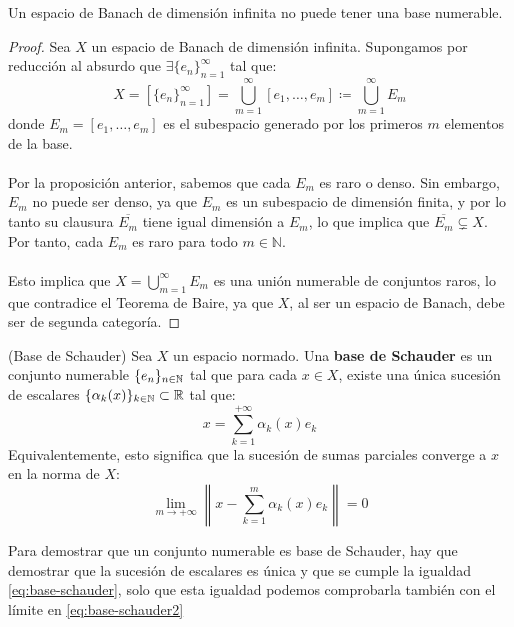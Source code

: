 \begin{coro}
    Un espacio de Banach de dimensión infinita no puede tener una base numerable.
\begin{proof}
    Sea $X$ un espacio de Banach de dimensión infinita. Supongamos por reducción al absurdo que $\exists \{e_n\}_{n=1}^{\infty}$ tal que:
    \begin{equation*}
        X = [\{e_n\}_{n=1}^{\infty}] = \bigcup_{m=1}^{\infty} [e_1, \dots, e_m] \coloneqq \bigcup_{m=1}^{\infty} E_m 
    \end{equation*}
    donde $E_m = [e_1, \dots, e_m]$ es el subespacio generado por los primeros $m$ elementos de la base.\\ \\
    \noindent
    Por la proposición anterior, sabemos que cada $E_m$ es raro o denso. Sin embargo, $E_m$ no puede ser denso, ya que $E_m$ es un subespacio de dimensión finita, y por lo tanto su clausura $\overline{E_m}$ tiene igual dimensión a $E_m$, lo que implica que $\overline{E_m} \subsetneq X$. Por tanto, cada $E_m$ es raro para todo $m \in \mathbb{N}$.\\ \\
    \noindent
    Esto implica que $X = \bigcup_{m=1}^{\infty} E_m$ es una unión numerable de conjuntos raros, lo que contradice el Teorema de Baire, ya que $X$, al ser un espacio de Banach, debe ser de segunda categoría.
\end{proof}
\end{coro}

\begin{definicion}(Base de Schauder)
    Sea $X$ un espacio normado. Una \textbf{base de Schauder} es un conjunto numerable $\{e_n\}_{n\in \mathbb{N}}$ tal que para cada $x \in X$, existe una única sucesión de escalares $\{\alpha_k(x)\}_{k\in \mathbb{N}} \subset \mathbb{R}$ tal que:
    \begin{equation}\label{eq:base-schauder}
        x = \sum_{k=1}^{+\infty} \alpha_k(x)e_k 
    \end{equation}
    Equivalentemente, esto significa que la sucesión de sumas parciales converge a $x$ en la norma de $X$:
    \begin{equation}\label{eq:base-schauder2}
        \lim_{m \to +\infty} \left\|x - \sum_{k=1}^{m} \alpha_k(x)e_k\right\| = 0 
    \end{equation}
\end{definicion}

\begin{observacion}
    Para demostrar que un conjunto numerable es base de Schauder, hay que demostrar que la sucesión de escalares es única y que se cumple la igualdad \ref{eq:base-schauder}, solo que esta igualdad podemos comprobarla también con el límite en \ref{eq:base-schauder2}
\end{observacion}

